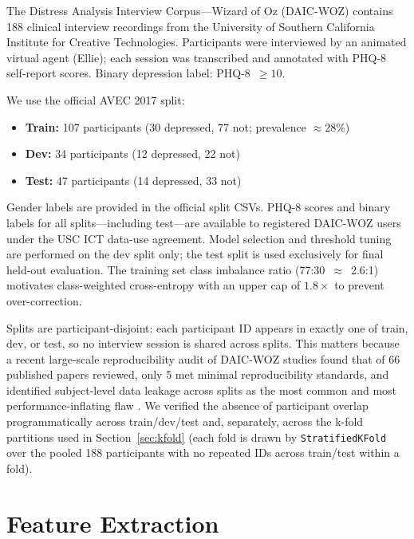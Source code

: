 \documentclass[5p,twocolumn]{elsarticle}
\begin{document}
The Distress Analysis Interview Corpus---Wizard of Oz (DAIC-WOZ)
\cite{gratch2014} contains 188 clinical interview recordings from
the University of Southern California Institute for Creative
Technologies. Participants were interviewed
by an animated virtual agent (Ellie); each session was transcribed
and annotated with PHQ-8 self-report scores. Binary depression label:
PHQ-8~$\geq 10$.

We use the official AVEC 2017 split:
\begin{itemize}
  \item \textbf{Train:} 107 participants (30 depressed, 77 not;
    prevalence $\approx28\%$)
  \item \textbf{Dev:} 34 participants (12 depressed, 22 not)
  \item \textbf{Test:} 47 participants (14 depressed, 33 not)
\end{itemize}

Gender labels are provided in the official split CSVs. PHQ-8 scores
and binary labels for all splits---including test---are available to
registered DAIC-WOZ users under the USC ICT data-use agreement.
Model selection and threshold tuning are performed on the dev split
only; the test split is used exclusively for final held-out evaluation.
The training set class
imbalance ratio (77:30~$\approx$~2.6:1) motivates class-weighted
cross-entropy with an upper cap of $1.8\times$ to prevent over-correction.

Splits are participant-disjoint: each participant ID appears in
exactly one of train, dev, or test, so no interview session is
shared across splits. This matters because a recent large-scale
reproducibility audit of DAIC-WOZ studies found that of 66 published
papers reviewed, only 5 met minimal reproducibility standards, and
identified subject-level data leakage across splits as the most
common and most performance-inflating flaw \cite{danylenko2026}. We
verified the absence of participant overlap programmatically across
train/dev/test and, separately, across the k-fold partitions used
in Section~\ref{sec:kfold} (each fold is drawn by \texttt{StratifiedKFold}
over the pooled 188 participants with no repeated IDs across
train/test within a fold).

\section{Feature Extraction}
\label{sec:features}
\end{document}
